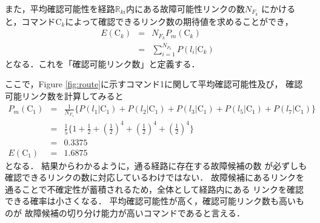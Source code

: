 \documentclass[11pt]{article}
\begin{document}
また，平均確認可能性を経路$\mathbb{R}_{ki}$内にある故障可能性リンクの数$N_{F_k}$
にかけると，コマンドC$_k$によって確認できるリンク数の期待値を求めることができ，
\begin{eqnarray}
   E(\text{C}_k) &=& N_{F_k}P_m(\text{C}_k)\\
   &=& \sum_{i=1}^{N_{F_k}}P(l_i|\text{C}_k)
\end{eqnarray} 
となる．これを「確認可能リンク数」と定義する．

ここで，Figure \ref{fig:route}に示すコマンド1に関して平均確認可能性及び，
確認可能リンク数を計算してみると
\begin{eqnarray}
   P_m(\text{C}_1) &=& \frac{1}{N_{F_1}} \{P(l_{1} | \text{C}_1) + P(l_{2} | \text{C}_1) +P(l_{3} | \text{C}_1)
   +P(l_{5} | \text{C}_1) + P(l_{7} | \text{C}_1)\} \\
   &=& \frac{1}{5} \{ 1 + \frac{1}{2} + \left( \frac{1}{2}\right)^4 + \left( \frac{1}{2}\right)^4
    + \left( \frac{1}{2}\right)^4 \}\\
    &=& 0.3375 \\
   E(\text{C}_1)  &=& 1.6875
\end{eqnarray} 
となる．
結果からわかるように，通る経路に存在する故障候補の数
が必ずしも確認できるリンクの数に対応しているわけではない．
故障候補にあるリンクを通ることで不確定性が蓄積されるため，全体として経路内にある
リンクを確認できる確率は小さくなる．
平均確認可能性が高く，確認可能リンク数も高いものが
故障候補の切り分け能力が高いコマンドであると言える．
\end{document}
